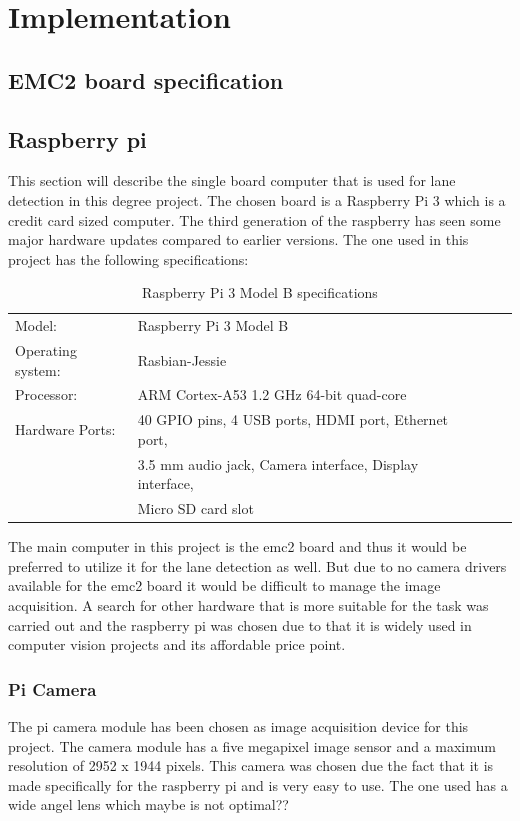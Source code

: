 \chapter{Implementation}

\section{EMC2 board specification}
\section{Raspberry pi}
This section will describe the single board computer that is used for lane detection in this degree project. The chosen board is a Raspberry Pi 3 which is a credit card sized computer. The third generation of the raspberry has seen some major hardware updates compared to earlier versions. The one used in this project has the following specifications:



\begin{table}[H]
\centering
\caption{Raspberry Pi 3 Model B specifications}
\label{my-label}
\begin{tabular}{lllll}
 Model:	&Raspberry Pi 3 Model B  \\
 Operating system:	&Rasbian-Jessie  \\
 Processor:	&ARM Cortex-A53 1.2 GHz 64-bit quad-core  \\
 Hardware Ports:	&40 GPIO pins, 4 USB ports, HDMI port, Ethernet port,\\  &3.5 mm audio jack, Camera interface, Display interface,\\  &Micro SD card slot
\end{tabular}
\end{table}



The main computer in this project is the emc2 board and thus it would be preferred to utilize it for the lane detection as well. But due to no camera drivers available for the emc2 board it would be difficult to manage the image acquisition. A search for other hardware that is more suitable for the task was carried out and the raspberry pi was chosen due to that it is widely used in computer vision projects and its affordable price point.

\subsection{Pi Camera}
The pi camera module has been chosen as image acquisition device for this project. The camera module has a five megapixel image sensor and a maximum resolution of 2952 x 1944 pixels. This camera was chosen due the fact that it is made specifically for the raspberry pi and is very easy to use. The one used has a wide angel lens which maybe is not optimal??






